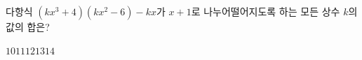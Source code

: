 다항식 $(kx^3+4)(kx^2-6)-kx$가 $x+1$로 나누어떨어지도록 하는 모든 상수 $k$의 값의 합은?
\begin{choices32}{$10$}{$11$}{$12$}{$13$}{$14$}\end{choices32}
